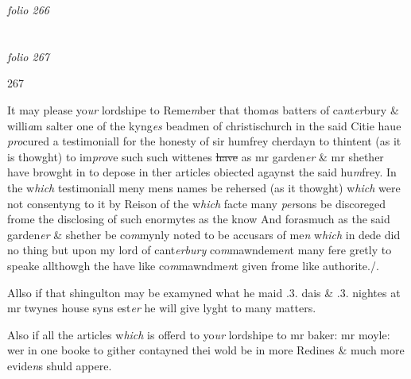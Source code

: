 \documentclass[12pt, a4paper]{book}
\begin{document}
\textit{folio 266}


         \vspace*{4cm}
         
\dotfill
						  \section*{}

\textit{folio 267}



            		\begin{flushright}{\color{Mahogany}267}\end{flushright}


		\ifthenelse{\isodd{\thepage}}
		{\reversemarginpar}
		{\normalmarginpar}
		It may please yo\textit{ur} lordshipe to Reme\textit{m}ber that thom\textit{a}s batters of ca\textit{n}t\textit{er}bury \& willi\textit{a}m salter
one of the kyng\textit{es} beadmen of christischurch in the said Citie haue \textit{pro}cured a testimoniall
for the honesty of sir humfrey cherdayn to thintent (as it is thowght) to im\textit{pro}ve such
such wittenes \sout{have} as mr garden\textit{er} \& mr shether have browght in to depose in ther articles
obiected agaynst the said hu\textit{m}frey. In the w\textit{hich} testimoniall meny mens
			 names be rehersed
(as it thowght) w\textit{hich} were not consentyng to it by Reison of the w\textit{hich} facte many \textit{per}sons
be discoreged frome the disclosing of such enormytes as the know And forasmuch as
the said garden\textit{er} \& shether be co\textit{m}mynly noted to be accusars of me\textit{n} w\textit{hich} in dede did no
thing but upon my lord of cant\textit{erbury} co\textit{m}mawndeme\textit{n}t many fere gretly to speake allthowgh
the have like co\textit{m}mawndme\textit{n}t given frome like authorite./. 

            		
		\ifthenelse{\isodd{\thepage}}
		{\reversemarginpar}
		{\normalmarginpar}
		Allso if that shingulton may be examyned what he maid .3. dais \& .3. nightes at 
mr twynes house syns est\textit{er} he will give lyght to many matters.
            		
		\ifthenelse{\isodd{\thepage}}
		{\reversemarginpar}
		{\normalmarginpar}
		Also if all the articles w\textit{hich} is offerd to yo\textit{ur} lordshipe to mr baker: mr moyle: wer in one
booke to gither contayned thei wold be in more Redines \& much more evide\textit{n}s shuld
appere.
            		
\end{document}

